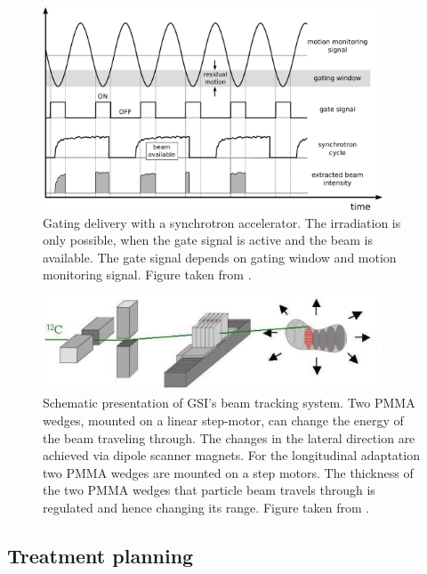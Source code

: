 \begin{figure}[tbp]
  \centering
  \includegraphics[width=0.9\textwidth]{./Fundamentals/Images/gatingscheme.pdf}
  \caption{Gating delivery with a synchrotron accelerator. The irradiation is only possible, when the gate signal is active and the beam is available. The gate signal
  depends on gating window and motion monitoring signal. Figure taken from \cite{Richter2012}.}
  \label{gating}
\end{figure}

\newpage
\begin{figure}[H]
\begin{center}
\includegraphics[width=0.9\textwidth]{./Fundamentals/Images/tracking.png}
\caption{Schematic presentation of GSI's beam tracking system. Two PMMA wedges, mounted on a linear step-motor, can change the energy of the beam traveling through. The changes in the 
lateral direction are achieved via dipole scanner magnets. For the longitudinal adaptation two 
PMMA wedges are mounted on a step motors. The thickness of the two PMMA wedges that particle beam travels through is regulated and hence changing its range. Figure taken from \cite{Groezinger2004}.}
\label{tracking}
\end{center}
\end{figure}

\subsection{Treatment planning}
\label{treatmentPlanning}

